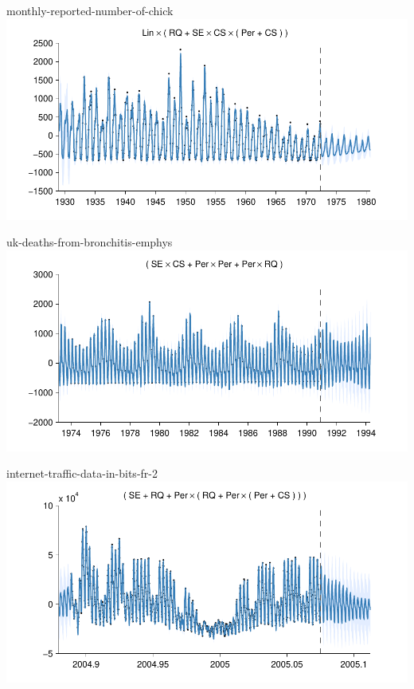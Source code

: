 \begin{frame}{monthly-reported-number-of-chick}
  \center
  \includegraphics[width=1.0\textwidth]{figures/monthly-reported-number-of-chick/monthly-reported-number-of-chick_all}
\end{frame}  

\begin{frame}{uk-deaths-from-bronchitis-emphys}
  \center
  \includegraphics[width=1.0\textwidth]{figures/uk-deaths-from-bronchitis-emphys/uk-deaths-from-bronchitis-emphys_all}
\end{frame}  

\begin{frame}{internet-traffic-data-in-bits-fr-2}
  \center
  \includegraphics[width=1.0\textwidth]{figures/internet-traffic-data-in-bits-fr-2/internet-traffic-data-in-bits-fr-2_all}
\end{frame}   

